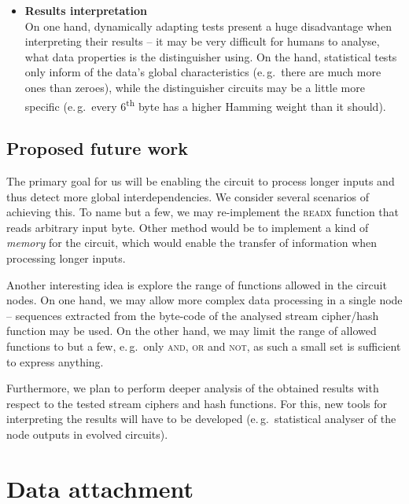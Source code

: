 \documentclass[12pt,oneside]{fithesis2}
\newcommand{\squarebullet}{\textcolor{black}{\raisebox{0.15em}{\rule{4pt}{4pt}}}}
\newenvironment{myItemize}{
  \begin{itemize}[leftmargin=2em,rightmargin=1em,itemsep=\parskip ,parsep=0em,topsep=0em,partopsep=0em]
  \renewcommand{\labelitemi}{\squarebullet}
  \renewcommand{\labelitemii}{$\diamond$}
}{
  \end{itemize}
}
\begin{document}
\begin{myItemize}
by EACirc dynamically adapt to the data stream. Thus, if a data stream changes its properties, the test will evolve accordingly
(predefined statistical tests never change).
\item \textbf{Results interpretation}\\
On one hand, dynamically adapting tests present a huge disadvantage when interpreting their results -- it may be very difficult for
humans to analyse, what data properties is the distinguisher using. On the hand, statistical tests only inform of the data's global
characteristics (e.\,g.\ there are much more ones than zeroes), while the distinguisher circuits may be a little more specific 
(e.\,g.\ every 6\textsuperscript{th} byte has a higher Hamming weight than it should).
\end{myItemize}

\section{Proposed future work}
\label{sec:outro-future-work}

The primary goal for us will be enabling the circuit to process longer inputs and thus detect more global interdependencies.
We consider several scenarios of achieving this. To name but a few, we may re-implement the \textsc{readx} function that
reads arbitrary input byte. Other method would be to implement a kind of \textit{memory} for the circuit, which would enable
the transfer of information when processing longer inputs.

Another interesting idea is explore the range of functions allowed in the circuit nodes. On one hand, we may allow more complex
data processing in a single node -- sequences extracted from the byte-code of the analysed stream cipher/hash function may be used.
On the other hand, we may limit the range of allowed functions to but a few, e.\,g.\ only \textsc{and}, \textsc{or} and \textsc{not},
as such a small set is sufficient to express anything.

Furthermore, we plan to perform deeper analysis of the obtained results with respect to the tested stream ciphers and hash functions.
For this, new tools for interpreting the results will have to be developed 
(e.\,g.\ statistical analyser of the node outputs in evolved circuits).

\appendix
\chapter{Data attachment}
\end{document}
